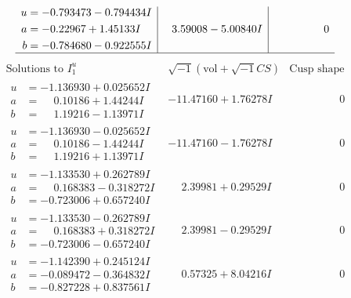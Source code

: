 \documentclass[1p]{elsarticle_modified}
\theoremstyle{definition}
\newcommand{\I}{\sqrt{-1}}
\begin{document}
$$\begin{array}{c|c|c}
\begin{aligned}
u &= -0.793473 - 0.794434 I \\
a &= -0.22967 + 1.45133 I \\
b &= -0.784680 - 0.922555 I\end{aligned}
 & \phantom{-}3.59008 - 5.00840 I & \phantom{-0.000000 } 0\\
 \hline 
 \end{array}$$\newpage$$\begin{array}{c|c|c}  
\text{Solutions to }I^u_{1}& \I (\text{vol} + \sqrt{-1}CS) & \text{Cusp shape}\\
 \hline 
\begin{aligned}
u &= -1.136930 + 0.025652 I \\
a &= \phantom{-}0.10186 + 1.44244 I \\
b &= \phantom{-}1.19216 - 1.13971 I\end{aligned}
 & -11.47160 + 1.76278 I & \phantom{-0.000000 } 0 \\ \hline\begin{aligned}
u &= -1.136930 - 0.025652 I \\
a &= \phantom{-}0.10186 - 1.44244 I \\
b &= \phantom{-}1.19216 + 1.13971 I\end{aligned}
 & -11.47160 - 1.76278 I & \phantom{-0.000000 } 0 \\ \hline\begin{aligned}
u &= -1.133530 + 0.262789 I \\
a &= \phantom{-}0.168383 - 0.318272 I \\
b &= -0.723006 + 0.657240 I\end{aligned}
 & \phantom{-}2.39981 + 0.29529 I & \phantom{-0.000000 } 0 \\ \hline\begin{aligned}
u &= -1.133530 - 0.262789 I \\
a &= \phantom{-}0.168383 + 0.318272 I \\
b &= -0.723006 - 0.657240 I\end{aligned}
 & \phantom{-}2.39981 - 0.29529 I & \phantom{-0.000000 } 0 \\ \hline\begin{aligned}
u &= -1.142390 + 0.245124 I \\
a &= -0.089472 - 0.364832 I \\
b &= -0.827228 + 0.837561 I\end{aligned}
 & \phantom{-}0.57325 + 8.04216 I & \phantom{-0.000000 } 0 \\ \hline\begin{aligned}

\end{aligned}
\end{array}$$
\end{document}
